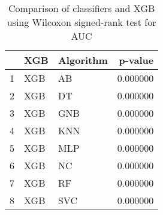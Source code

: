 \begin{table}
\footnotesize
\caption{Comparison of classifiers and XGB using Wilcoxon signed-rank test for AUC}
\label{tab:XGB wilcoxon AUC comparison}
\begin{tabular}{lllr}
\hline
 & XGB & Algorithm & p-value \\
\hline
1 & XGB & AB & 0.000000 \\
2 & XGB & DT & 0.000000 \\
3 & XGB & GNB & 0.000000 \\
4 & XGB & KNN & 0.000000 \\
5 & XGB & MLP & 0.000000 \\
6 & XGB & NC & 0.000000 \\
7 & XGB & RF & 0.000000 \\
8 & XGB & SVC & 0.000000 \\
\hline
\end{tabular}
\end{table}
